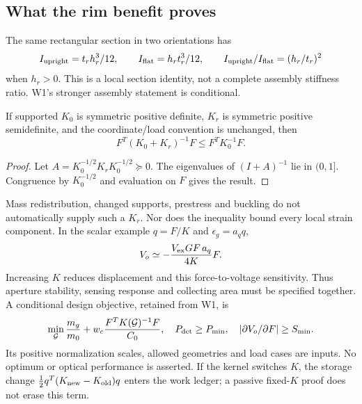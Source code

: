 \subsection{What the rim benefit proves}
The same rectangular section in two orientations has
\begin{equation}
 I_{\rm upright}=t_rh_r^3/12,\qquad
 I_{\rm flat}=h_rt_r^3/12,\qquad
 I_{\rm upright}/I_{\rm flat}=(h_r/t_r)^2
\end{equation}
when $h_r>0$. This is a local section identity, not a complete assembly
stiffness ratio. W1's stronger assembly statement is conditional.
\begin{proposition}
If supported $K_0$ is symmetric positive definite, $K_r$ is symmetric
positive semidefinite, and the coordinate/load convention is unchanged, then
\begin{equation}
 F^T(K_0+K_r)^{-1}F\le F^TK_0^{-1}F.
\end{equation}
\end{proposition}
\begin{proof}
Let $A=K_0^{-1/2}K_rK_0^{-1/2}\succeq0$. The eigenvalues of
$(I+A)^{-1}$ lie in $(0,1]$. Congruence by $K_0^{-1/2}$ and evaluation on
$F$ gives the result.
\end{proof}
Mass redistribution, changed supports, prestress and buckling do not
automatically supply such a $K_r$. Nor does the inequality bound every local
strain component. In the scalar example $q=F/K$ and $\epsilon_g=a_qq$,
\begin{equation}
 V_o\simeq-\frac{V_{\rm ex}GF\,a_q}{4K}F.
\end{equation}
Increasing $K$ reduces displacement and this force-to-voltage sensitivity.
Thus aperture stability, sensing response and collecting area must be
specified together. A conditional design objective, retained from W1, is
\begin{equation}
 \min_{\mathcal G}\frac{m_g}{m_0}
   +w_c\frac{F^TK(\mathcal G)^{-1}F}{C_0},\quad
 P_{\rm det}\ge P_{\min},\quad
 |\partial V_o/\partial F|\ge S_{\min} .
\end{equation}
Its positive normalization scales, allowed geometries and load cases are
inputs. No optimum or optical performance is asserted. If the kernel switches
$K$, the storage change $\tfrac12q^T(K_{\rm new}-K_{\rm old})q$ enters the
work ledger; a passive fixed-$K$ proof does not erase this term.

